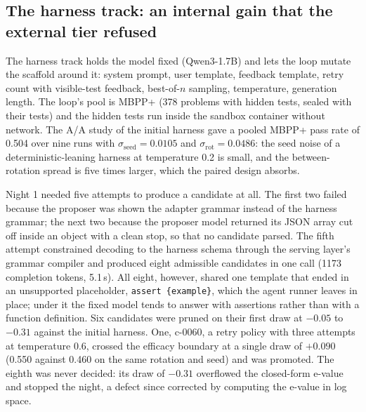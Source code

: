 \subsection{The harness track: an internal gain that the external tier refused}
\label{sec:results-harness}

The harness track holds the model fixed (Qwen3-1.7B) and lets the loop mutate the scaffold around it: system prompt, user template, feedback template, retry count with visible-test feedback, best-of-$n$ sampling, temperature, generation length. The loop's pool is MBPP+ (378 problems with hidden tests, sealed with their tests) and the hidden tests run inside the sandbox container without network. The A/A study of the initial harness gave a pooled MBPP+ pass rate of 0.504 over nine runs with $\sigma_{\mathrm{seed}}=0.0105$ and $\sigma_{\mathrm{rot}}=0.0486$: the seed noise of a deterministic-leaning harness at temperature 0.2 is small, and the between-rotation spread is five times larger, which the paired design absorbs.

Night 1 needed five attempts to produce a candidate at all. The first two failed because the proposer was shown the adapter grammar instead of the harness grammar; the next two because the proposer model returned its JSON array cut off inside an object with a clean stop, so that no candidate parsed. The fifth attempt constrained decoding to the harness schema through the serving layer's grammar compiler and produced eight admissible candidates in one call (1173 completion tokens, 5.1\,s). All eight, however, shared one template that ended in an unsupported placeholder, \texttt{assert \{example\}}, which the agent runner leaves in place; under it the fixed model tends to answer with assertions rather than with a function definition. Six candidates were pruned on their first draw at $-0.05$ to $-0.31$ against the initial harness. One, c-0060, a retry policy with three attempts at temperature 0.6, crossed the efficacy boundary at a single draw of $+0.090$ (0.550 against 0.460 on the same rotation and seed) and was promoted. The eighth was never decided: its draw of $-0.31$ overflowed the closed-form e-value and stopped the night, a defect since corrected by computing the e-value in log space.

